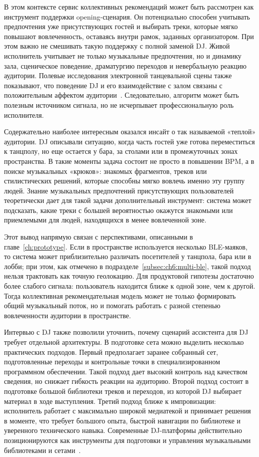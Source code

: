 В этом контексте сервис коллективных рекомендаций может быть рассмотрен как инструмент поддержки opening-сценария. Он потенциально способен учитывать предпочтения уже присутствующих гостей и выбирать треки, которые мягко повышают вовлеченность, оставаясь внутри рамок, заданных организатором. При этом важно не смешивать такую поддержку с полной заменой DJ. Живой исполнитель учитывает не только музыкальные предпочтения, но и динамику зала, сценическое поведение, драматургию переходов и невербальную реакцию аудитории. Полевые исследования электронной танцевальной сцены также показывают, что поведение DJ и его взаимодействие с залом связаны с положительным аффектом аудитории~\cite{rudnicki2025djs}. Следовательно, алгоритм может быть полезным источником сигнала, но не исчерпывает профессиональную роль исполнителя.

Содержательно наиболее интересным оказался инсайт о так называемой «теплой» аудитории. DJ описывали ситуацию, когда часть гостей уже готова переместиться к танцполу, но еще остается у бара, за столами или в промежуточных зонах пространства. В такие моменты задача состоит не просто в повышении BPM, а в поиске музыкальных «крюков»: знакомых фрагментов, треков или стилистических решений, которые способны мягко вовлечь именно эту группу людей. Знание музыкальных предпочтений присутствующих пользователей теоретически дает для такой задачи дополнительный инструмент: система может подсказать, какие треки с большей вероятностью окажутся знакомыми или приемлемыми для людей, находящихся в менее вовлеченной зоне.

Этот вывод напрямую связан с перспективами, описанными в главе~\ref{ch:prototype}. Если в пространстве используется несколько BLE-маяков, то система может приблизительно различать посетителей у танцпола, бара или в лобби; при этом, как отмечено в подразделе~\ref{subsec:ch6:multi-ble}, такой подход нельзя трактовать как точную геолокацию. Для продуктовой гипотезы достаточно более слабого сигнала: пользователь находится ближе к одной зоне, чем к другой. Тогда коллективная рекомендательная модель может не только формировать общий музыкальный поток, но и помогать работать с разной степенью вовлеченности аудитории в пространстве.

Интервью с DJ также позволили уточнить, почему сценарий ассистента для DJ требует отдельной архитектуры. В подготовке сета можно выделить несколько практических подходов. Первый предполагает заранее собранный сет, подготовленные переходы и контрольные точки в специализированном программном обеспечении. Такой подход дает высокий контроль над качеством сведения, но снижает гибкость реакции на аудиторию. Второй подход состоит в подготовке большой библиотеки треков и переходов, из которой DJ выбирает материал в ходе выступления. Третий подход ближе к импровизации: исполнитель работает с максимально широкой медиатекой и принимает решения в моменте, что требует большого опыта, быстрой навигации по библиотеке и уверенного технического навыка. Современные DJ-платформы действительно позиционируются как инструменты для подготовки и управления музыкальными библиотеками и сетами~\cite{rekordbox_software}.

